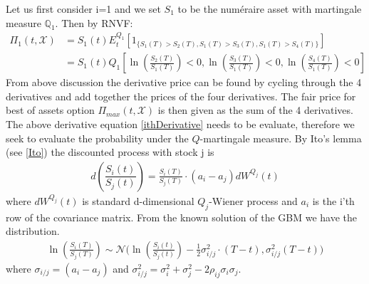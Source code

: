 Let us first consider i=1 and we set $S_1$ to be the numéraire asset with martingale measure $\mathbb{Q}_1$. Then by RNVF:
\begin{equation}\label{ithDerivative}
\begin{split}
\Pi_1(t, \mathcal{X})&=S_1(t)E_t^{Q_1}[1_{\{S_1(T)>S_2(T), S_1(T)>S_3(T), S_1(T)>S_4(T)\}}]\\
&=S_1(t) Q_1[\ln(\frac{S_2(T)}{S_1(T)})<0, \ln(\frac{S_3(T)}{S_1(T)})<0, \ln(\frac{S_4(T)}{S_1(T)})<0]
\end{split}
\end{equation}
From above discussion the derivative price can be found by cycling through the 4 derivatives and add together the prices of the four derivatives. The fair price for best of assets option $\Pi_{max}(t,\mathcal{X})$ is then given as the sum of the 4 derivatives. The above derivative equation \eqref{ithDerivative} needs to be evaluate, therefore we seek to evaluate the probability under the $Q$-martingale measure. By Ito's lemma (see \ref{Ito}) the discounted process with stock j is
\begin{align}
d(\dfrac{S_i(t)}{S_j(t)})=\frac{S_i(T)}{S_j(T)} \cdot (a_i-a_j)dW^{Q_j}(t) 
\end{align}
where $dW^{Q_j}(t)$ is standard d-dimensional $Q_j$-Wiener process and $a_i$ is the i'th row of the covariance matrix. From the known solution of the GBM we have the distribution.
\begin{align*}
\ln(\frac{S_i(T)}{S_j(T)})\sim \mathcal{N}\bigg(\ln(\frac{S_i(t)}{S_j(t)}) - \frac{1}{2}\sigma_{i/j}^2 \cdot (T-t), \sigma_{i/j}^2 (T-t)\bigg)
\end{align*}
where $\sigma_{i/j}=(a_i-a_j)$ and $\sigma_{i/j}^2=\sigma_i^2+\sigma_j^2-2\rho_{ij}\sigma_i \sigma_j$.\\

